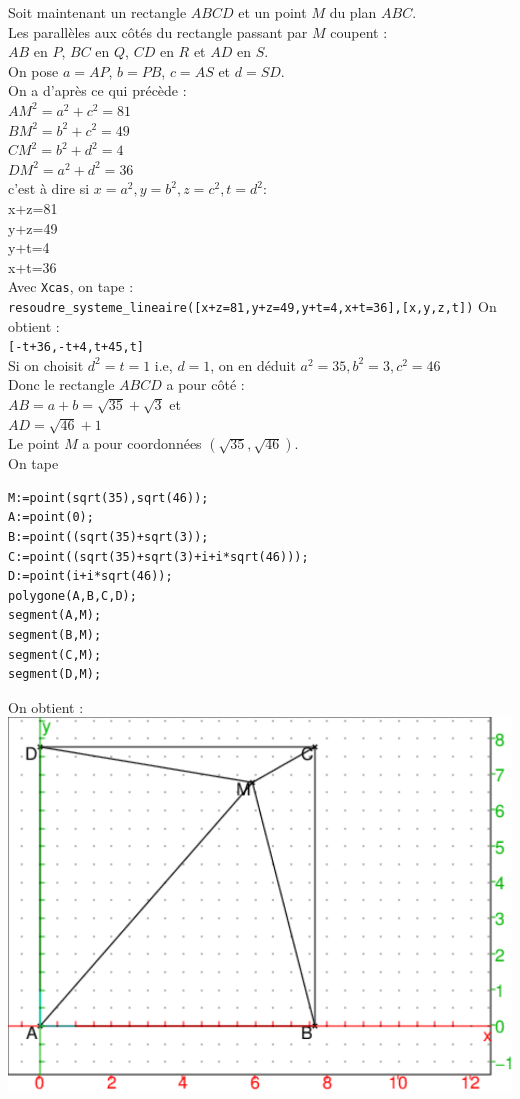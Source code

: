\documentclass[a4paper,11pt]{book}
\begin{document}
Soit maintenant un rectangle $ABCD$ et un point $M$ du plan $ABC$.\\
Les parall\`eles aux c\^ot\'es du rectangle passant par $M$ coupent :\\
$AB$ en $P$, $BC$ en $Q$, $CD$ en $R$ et $AD$ en $S$.\\
On pose  $a=AP$, $b=PB$, $c=AS$ et $d=SD$.\\
On a d'apr\`es ce qui pr\'ec\`ede :\\
$AM^2=a^2+c^2=81$\\
$BM^2=b^2+c^2=49$\\
$CM^2=b^2+d^2=4$\\
$DM^2=a^2+d^2=36$\\
c'est \`a dire si $x=a^2,y=b^2,z=c^2,t=d^2$:\\
x+z=81\\
y+z=49\\
y+t=4\\
x+t=36\\
Avec {\tt Xcas}, on tape :\\
{\tt resoudre\_systeme\_lineaire([x+z=81,y+z=49,y+t=4,x+t=36],[x,y,z,t])}
On obtient :\\
{\tt [-t+36,-t+4,t+45,t]}\\
Si on choisit $d^2=t=1$ i.e, $d=1$, on en d\'eduit $a^2=35,b^2=3,c^2=46$\\
Donc le rectangle $ABCD$ a pour c\^ot\'e :\\
$AB=a+b=\sqrt{35}+\sqrt 3$ et\\
$AD=\sqrt{46}+1$\\
Le point $M$ a pour coordonn\'ees $(\sqrt{35},\sqrt{46})$.\\
On tape
\begin{verbatim}
M:=point(sqrt(35),sqrt(46));
A:=point(0);
B:=point((sqrt(35)+sqrt(3));
C:=point((sqrt(35)+sqrt(3)+i+i*sqrt(46)));
D:=point(i+i*sqrt(46));
polygone(A,B,C,D);
segment(A,M);
segment(B,M);
segment(C,M);
segment(D,M);
\end{verbatim}
On obtient :\\
\includegraphics[width=\textwidth]{castrois1}\\
\end{document}
